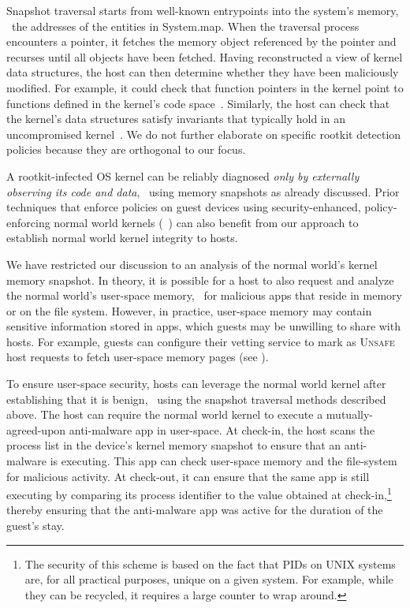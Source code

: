 Snapshot traversal starts from well-known entrypoints into the system's memory,
\eg~the addresses of the entities in \textsf{System.map}. When the traversal
process encounters a pointer, it fetches the memory object referenced by the
pointer and recurses until all objects have been fetched.  Having reconstructed
a view of kernel data structures, the host can then determine whether they have
been maliciously modified. For example, it could check that function pointers
in the kernel point to functions defined in the kernel's code
space~\cite{sbcfi:ccs07}. Similarly, the host can check that the kernel's data
structures satisfy invariants that typically hold in an uncompromised
kernel~\cite{gib:tdsc11}. We do not further elaborate on specific rootkit
detection policies because they are orthogonal to our focus.

A rootkit-infected OS kernel can be reliably diagnosed \textit{only by
externally observing its code and data}, \eg~using memory snapshots as already
discussed. Prior techniques that enforce policies on guest devices using
security-enhanced, policy-enforcing normal world kernels
(\eg~\cite{asm:sec14,flaskdroid:sec13,conxsense:asiaccs14,worlddriven:ccs14,blindspot:2009,markit:upside14,knox:mdm,ms:intune,blackberry:emm})
can also benefit from our approach to establish normal world kernel integrity
to hosts.

We have restricted our discussion to an analysis of the normal world's kernel
memory snapshot. In theory, it is possible for a host to also request and
analyze the normal world's user-space memory, \eg~for malicious apps that
reside in memory or on the file system. However, in practice, user-space
memory may contain sensitive information stored in apps, which guests may be
unwilling to share with hosts. For example, guests can configure their vetting
service to mark as \textsc{Unsafe} host requests to fetch user-space memory
pages (see ). 

To ensure user-space security, hosts can leverage the normal world kernel after
establishing that it is benign, \eg~using the snapshot traversal methods
described above. The host can require the normal world kernel to execute a
mutually-agreed-upon anti-malware app in user-space. At check-in, the host
scans the process list in the device's kernel memory snapshot to ensure that an
anti-malware is executing. This app can check user-space memory and the
file-system for malicious activity. At check-out, it can ensure that the same
app is still executing by comparing its process identifier to the value
obtained at check-in,\footnote{The security of this scheme is based on the fact
that PIDs on UNIX systems are, for all practical purposes, unique on a given
system. For example, while they can be recycled, it requires a large counter to
wrap around.} thereby ensuring that the anti-malware app was active for the
duration of the guest's stay.

